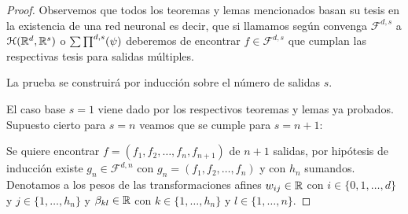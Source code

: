 \begin{proof}
    Observemos que todos los teoremas y lemas mencionados basan su tesis
    en la existencia de una red neuronal es decir, que si llamamos según 
    convenga $\mathcal{F}^{d,s}$ a $\mathcal{H}(\mathbb{R}^d,\mathbb{R}^s)$ o $\sum \prod^{d,s} (\psi)$ deberemos de 
    encontrar $f \in \mathcal{F}^{d,s}$ que cumplan las respectivas tesis para salidas múltiples. 

    La prueba se construirá por inducción sobre el número de salidas $s$. 

\reversemarginpar
\setlength{\marginparwidth}{\smallMarginSize}

\normalmarginpar
\setlength{\marginparwidth}{\bigMarginSize}

    El caso base $s=1$ viene dado por los respectivos teoremas y lemas ya probados.
    Supuesto cierto para $s = n$ veamos que se cumple para $s=n+1$: 
    
    Se quiere encontrar 
    $f = (f_1, f_2, \ldots, f_n, f_{n+1})$ de $n+1$ salidas, 
    por hipótesis de inducción existe $g_n \in \mathcal{F}^{d,n}$ con
     $g_n = (f_1, f_2, \ldots, f_n)$ y con $h_n$ sumandos. Denotamos a los pesos de las transformaciones afines 
     $w_{i j} \in \mathbb{R}$ con 
     $i \in \{0, 1, \ldots , d \}$  y  $j \in \{1, \ldots ,h_n \}$ 
     y $\beta_{ k l} \in \mathbb{R}$ con 
     $k \in \{1, \ldots ,h_n \}$  y  $l \in \{1, \ldots ,n \}.$


\end{proof}
